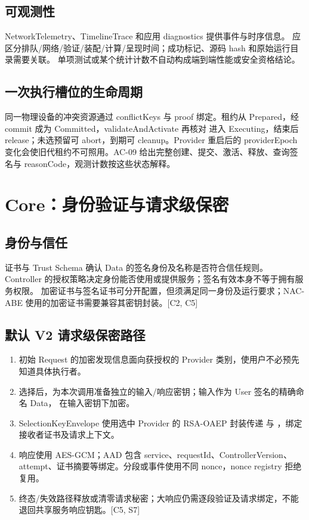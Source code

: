 \subsection{可观测性}
NetworkTelemetry、TimelineTrace 和应用 diagnostics 提供事件与时序信息。
应区分排队/网络/验证/装配/计算/呈现时间；成功标记、源码 hash 和原始运行目录需要关联。
单项测试或某个统计计数不自动构成端到端性能或安全资格结论。


\subsection{一次执行槽位的生命周期}
同一物理设备的冲突资源通过 conflictKeys 与 proof 绑定。租约从 Prepared，经 commit 成为 Committed，validateAndActivate 再核对  进入 Executing，结束后 release；未选预留可 abort，到期可 cleanup。Provider 重启后的 providerEpoch 变化会使旧代租约不可照用。AC-09 给出完整创建、提交、激活、释放、查询签名与 reasonCode，观测计数按这些状态解释。

\newpage

\section{Core：身份验证与请求级保密}
\subsection{身份与信任}
证书与 Trust Schema 确认 Data 的签名身份及名称是否符合信任规则。
Controller 的授权策略决定身份能否使用或提供服务；签名有效本身不等于拥有服务权限。
加密证书与签名证书可分开配置，但须满足同一身份及运行要求；NAC-ABE 使用的加密证书需要兼容其密钥封装。[C2, C5]

\subsection{默认 V2 请求级保密路径}
\begin{enumerate}
\item 初始 Request 的加密发现信息面向获授权的 Provider 类别，使用户不必预先知道具体执行者。
\item 选择后，为本次调用准备独立的输入/响应密钥；输入作为 User 签名的精确命名 Data，
在输入密钥下加密。
\item SelectionKeyEnvelope 使用选中 Provider 的 RSA-OAEP 封装传递
 与 ，绑定接收者证书及请求上下文。
\item 响应使用 AES-GCM；AAD 包含 service、requestId、ControllerVersion、
attempt、证书摘要等绑定。分段或事件使用不同 nonce，nonce registry 拒绝复用。
\item 终态/失效路径释放或清零请求秘密；大响应仍需逐段验证及请求绑定，不能退回共享服务响应钥匙。[C5, S7]
\end{enumerate}


